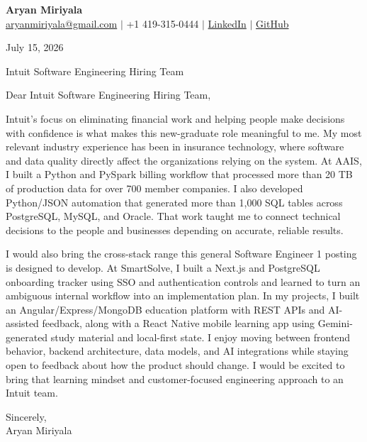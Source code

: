 \documentclass[letterpaper,11pt]{article}
\begin{document}
{\Large\textbf{Aryan Miriyala}}\\
\href{mailto:aryanmiriyala@gmail.com}{aryanmiriyala@gmail.com} $|$ +1 419-315-0444 $|$
\href{https://www.linkedin.com/in/aryan-miriyala-7788a21b6/}{LinkedIn} $|$
\href{https://github.com/aryanmiriyala}{GitHub}

July 15, 2026

Intuit Software Engineering Hiring Team

Dear Intuit Software Engineering Hiring Team,

Intuit's focus on eliminating financial work and helping people make decisions with confidence is what makes this new-graduate role meaningful to me. My most relevant industry experience has been in insurance technology, where software and data quality directly affect the organizations relying on the system. At AAIS, I built a Python and PySpark billing workflow that processed more than 20 TB of production data for over 700 member companies. I also developed Python/JSON automation that generated more than 1,000 SQL tables across PostgreSQL, MySQL, and Oracle. That work taught me to connect technical decisions to the people and businesses depending on accurate, reliable results.

I would also bring the cross-stack range this general Software Engineer 1 posting is designed to develop. At SmartSolve, I built a Next.js and PostgreSQL onboarding tracker using SSO and authentication controls and learned to turn an ambiguous internal workflow into an implementation plan. In my projects, I built an Angular/Express/MongoDB education platform with REST APIs and AI-assisted feedback, along with a React Native mobile learning app using Gemini-generated study material and local-first state. I enjoy moving between frontend behavior, backend architecture, data models, and AI integrations while staying open to feedback about how the product should change. I would be excited to bring that learning mindset and customer-focused engineering approach to an Intuit team.

Sincerely,\\
Aryan Miriyala
\end{document}
